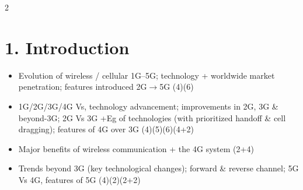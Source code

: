 \documentclass[10pt]{article}
\begin{document}
\begin{multicols}{2}
\footnotesize

\section*{1. Introduction}
\begin{itemize}
  \item Evolution of wireless / cellular 1G--5G; technology + worldwide market penetration; features introduced 2G$\rightarrow$5G \hfill (4)(6)
  \item 1G/2G/3G/4G Vs, technology advancement; improvements in 2G, 3G \& beyond-3G; 2G Vs 3G +Eg of technologies (with prioritized handoff \& cell dragging); features of 4G over 3G \hfill (4)(5)(6)(4+2)
  \item Major benefits of wireless communication + the 4G system \hfill (2+4)
  \item Trends beyond 3G (key technological changes); forward \& reverse channel; 5G Vs 4G, features of 5G \hfill (4)(2)(2+2)
\end{itemize}


\end{multicols}
\end{document}

